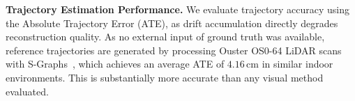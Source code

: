 \textbf{Trajectory Estimation Performance.}
We evaluate trajectory accuracy using the Absolute Trajectory Error (ATE), as drift accumulation directly degrades reconstruction quality.
As no external input of ground truth was available, reference trajectories are generated by processing Ouster OS0-64 LiDAR scans with S-Graphs~\cite{bavle2025s}, which achieves an average ATE of $4.16\,\text{cm}$ in similar indoor environments. This is substantially more accurate than any visual method evaluated.






